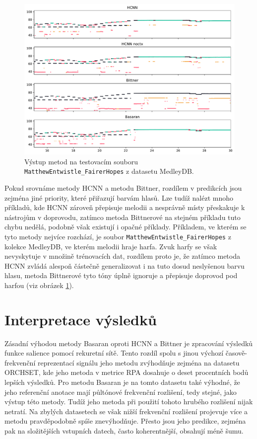 \begin{figure}[h]\centering
\includegraphics[width=\textwidth,height=\textheight,keepaspectratio]{../img/vysledky/mdb_MatthewEntwistle_FairerHopes}
\caption{Výstup metod na testovacím souboru \texttt{MatthewEntwistle\_FairerHopes} z datasetu MedleyDB.}
\label{obr:mdb_MatthewEntwistle_FairerHopes}
\end{figure}
Pokud srovnáme metody HCNN a metodu Bittner, rozdílem v predikcích jsou zejména jiné priority, které přiřazují barvám hlasů. Lze tudíž nalézt mnoho příkladů, kde HCNN zároveň přepisuje melodii a nesprávně místy přeskakuje k nástrojům v doprovodu, zatímco metoda Bittnerové na stejném příkladu tuto chybu nedělá, podobně však existují i opačné příklady. Příkladem, ve kterém se tyto metody nejvíce rozchází, je soubor \texttt{MatthewEntwistle\_FairerHopes} z kolekce MedleyDB, ve kterém melodii hraje harfa. Zvuk harfy se však nevyskytuje v množině trénovacích dat, rozdílem proto je, že zatímco metoda HCNN zvládá alespoň částečně generalizovat i na tuto dosud neslyšenou barvu hlasu, metoda Bittnerové tyto tóny úplně ignoruje a přepisuje doprovod pod harfou (viz obrázek \ref{obr:mdb_MatthewEntwistle_FairerHopes}).

\section{Interpretace výsledků}

Zásadní výhodou metody Basaran oproti HCNN a Bittner je zpracování výsledků funkce salience pomocí rekuretní sítě. Tento rozdíl spolu s jinou výchozí časově-frekvenční reprezentací signálu jeho metodu zvýhodňuje zejména na datasetu ORCHSET, kde jeho metoda v metrice RPA dosahuje o deset procentních bodů lepších výsledků. Pro metodu Basaran je na tomto datasetu také výhodné, že jeho referenční anotace mají půltónové frekvenční rozlišení, tedy stejné, jako výstup této metody. Tudíž jeho metoda při použití tohoto hrubého rozlišení nijak netratí. Na zbylých datasetech se však nižší frekvenční rozlišení projevuje více a metodu pravděpodobně spíše znevýhodňuje. Přesto jsou jeho predikce, zejména pak na složitějších vstupních datech, často koherentnější, obsahují méně šumu. 

